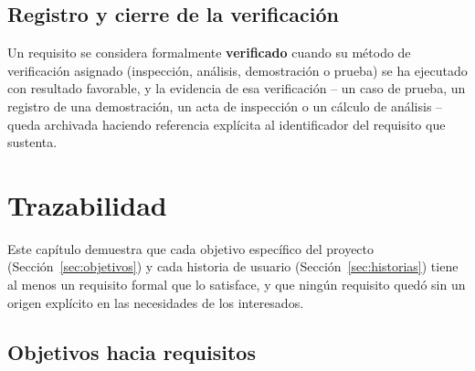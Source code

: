 \documentclass[11pt,a4paper]{report}
\begin{document}
\section{Registro y cierre de la verificaci\'on}

Un requisito se considera formalmente \textbf{verificado} cuando su m\'etodo de verificaci\'on asignado (inspecci\'on, an\'alisis, demostraci\'on o prueba) se ha ejecutado con resultado favorable, y la evidencia de esa verificaci\'on -- un caso de prueba, un registro de una demostraci\'on, un acta de inspecci\'on o un c\'alculo de an\'alisis -- queda archivada haciendo referencia expl\'icita al identificador del requisito que sustenta.

\chapter{Trazabilidad}
\label{ch:trazabilidad}

Este cap\'itulo demuestra que cada objetivo espec\'ifico del proyecto (Secci\'on~\ref{sec:objetivos}) y cada historia de usuario (Secci\'on~\ref{sec:historias}) tiene al menos un requisito formal que lo satisface, y que ning\'un requisito qued\'o sin un origen expl\'icito en las necesidades de los interesados.

\section{Objetivos hacia requisitos}
\end{document}
